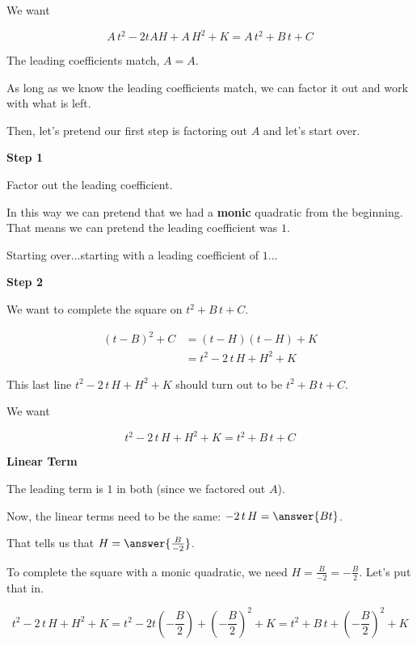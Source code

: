 \documentclass{ximera}
\begin{document}
We want


\[ A \, t^2 - 2 t A H + A \, H^2 + K = A \, t^2 + B \, t + C \]


The leading coefficients match, $A = A$.

As long as we know the leading coefficients match, we can factor it out and work with what is left.

Then, let's pretend our first step is factoring out $A$ and let's start over. 






\textbf{\textcolor{blue!75!black}{Step 1}} 

 Factor out the leading coefficient.   

 In this way we can pretend that we had a \textbf{monic} quadratic from the beginning.  That means we can pretend the leading coefficient was $1$.


Starting over...starting with a leading coefficient of $1$...


\textbf{\textcolor{blue!75!black}{Step 2}} 


We want to complete the square on $t^2 + B \, t + C$.  



\begin{align*}
(t-B)^2 + C & = (t - H)(t - H) + K \\
& = t^2 - 2 \, t \, H + H^2 + K  
\end{align*}


This last line $t^2 - 2 \, t \, H + H^2 + K$ should turn out to be $t^2 + B \, t + C$.

We want


\[   t^2 - 2 \, t \, H + H^2 + K = t^2 + B \, t + C   \]



\begin{explanation} \textbf{\textcolor{red!75!green}{Linear Term}} 


The leading term is $1$ in both (since we factored out $A$). 

Now, the linear terms need to be the same: $ - 2 \, t \, H = \answer{B t}$.  

That tells us that $H = \answer{\frac{B}{-2}}$.

\end{explanation}


To complete the square with a monic quadratic, we need $H = \frac{B}{-2} = -\frac{B}{2}$.  Let's put that in.


\[ t^2 - 2 \, t \, H + H^2 + K = t^2 - 2 t \left( -\frac{B}{2} \right) + \left( -\frac{B}{2} \right)^2 + K = t^2 + B \, t + \left(-\frac{B}{2}\right)^2 + K \]
\end{document}
